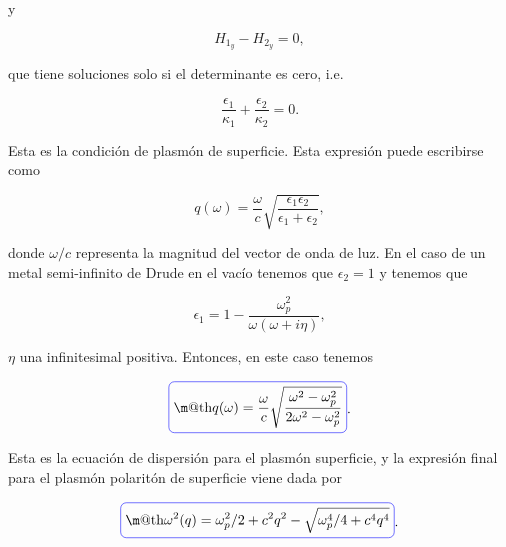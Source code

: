 \documentclass[a4paper,11pt]{article}
\makeatletter
\numberwithin{equation}{section}
\newcommand*{\boxcolor}{blue}
\renewcommand{\boxed}[1]{\textcolor{\boxcolor}{%
\tikz[baseline={([yshift=-1ex]current bounding box.center)}] \node [rectangle, minimum width=1ex,rounded corners,draw] {\normalcolor\m@th$\displaystyle#1$};}}
\makeatother
\begin{document}
y 

\begin{equation}
 H_{1_y} - H_{2_y} = 0,
\end{equation}

que tiene soluciones solo si el determinante es cero, i.e. 

\begin{equation}
 \frac{\epsilon_1}{\kappa_1} + \frac{\epsilon_2}{\kappa_2} = 0.
\end{equation}

Esta es la condición de plasmón de superficie. Esta expresión puede escribirse como 

\begin{equation}
 q(\omega) = \frac{\omega}{c} \sqrt{\frac{\epsilon_1\epsilon_2}{\epsilon_1 + 
 \epsilon_2}},
\end{equation}

donde $\omega/c$ representa la magnitud del vector de onda de luz. En el caso 
de un metal semi-infinito de Drude en el vacío tenemos que $\epsilon_2 = 1$ y 
tenemos que 

\begin{equation}
 \epsilon_1 = 1 - \frac{\omega_p^2}{\omega(\omega + i\eta)},
\end{equation}

$\eta$ una infinitesimal positiva. Entonces, en este caso tenemos 

\begin{equation}
 \boxed{q(\omega) = \frac{\omega}{c}\sqrt{\frac{\omega^2 - \omega_p^2}{2\omega^2 - 
 \omega_p^2}}}.
\end{equation}

Esta es la ecuación de dispersión para el plasmón superficie, y la expresión 
final para el plasmón polaritón de superficie viene dada por 

\begin{equation}
 \boxed{\omega^2(q) = \omega_p^2/2 + c^2q^2 - \sqrt{\omega_p^4/4 + c^4q^4}}.
\end{equation}
\end{document}
